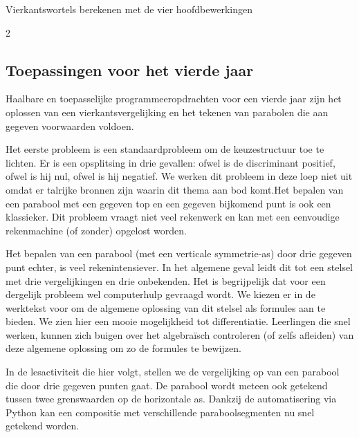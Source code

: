 \begin{lesactiviteit}{Vierkantswortels berekenen met de vier hoofdbewerkingen}
\begin{vraagenantwoord} [resume]
       
    \end{vraagenantwoord}
    \end{lesactiviteit}
    
    
	\begin{multicols}{2}
	\subsection{Toepassingen voor het vierde jaar}
	
	Haalbare en toepasselijke programmeeropdrachten voor een vierde jaar zijn het oplossen van een vierkantsvergelijking en het tekenen van parabolen die aan gegeven voorwaarden voldoen. 
	
	Het eerste probleem is een standaardprobleem om de keuzestructuur toe te lichten. Er is een opsplitsing in drie gevallen: ofwel is de discriminant positief, ofwel is hij nul, ofwel is hij negatief. We werken dit probleem in deze loep niet uit omdat er talrijke bronnen zijn waarin dit thema aan bod komt.Het bepalen van een parabool met een gegeven top en een gegeven bijkomend punt is ook een klassieker. Dit probleem vraagt niet veel rekenwerk en kan met een eenvoudige rekenmachine (of zonder) opgelost worden. 
	
	Het bepalen van een parabool (met een verticale symmetrie-as) door drie gegeven punt echter, is veel rekenintensiever. In het algemene geval leidt dit tot een stelsel met drie vergelijkingen en drie onbekenden. Het is begrijpelijk dat voor een dergelijk probleem wel computerhulp gevraagd wordt. We kiezen er in de werktekst voor om de algemene oplossing van dit stelsel als formules aan te bieden. We zien hier een mooie mogelijkheid tot differentiatie. Leerlingen die snel werken, kunnen zich buigen over het algebraïsch controleren (of zelfs afleiden) van deze algemene oplossing om zo de formules te bewijzen.  
	
	In de lesactiviteit die hier volgt, stellen we de vergelijking op van een parabool die door drie gegeven punten gaat. De parabool wordt meteen ook getekend tussen twee grenswaarden op de horizontale as. Dankzij de automatisering via Python kan een compositie met verschillende paraboolsegmenten nu snel getekend worden. 
	\end{multicols}	
	
